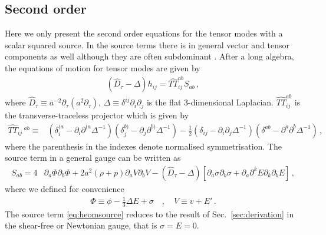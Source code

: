\documentclass[a4paper,11pt]{article}
\numberwithin{equation}{section}
\begin{document}
\subsection{Second order}
Here we only present the second order equations for the tensor modes with a scalar squared source. In the source terms there is in general vector and tensor components as well although they are often subdominant \cite{Gong:2019mui}. After a long algebra, the equations of motion for tensor modes are given by \cite{Domenech:2017ems}
\begin{align}\label{eq:heom}
(\hat D_\tau-\Delta) h_{ij}=\widehat{TT}^{ab}_{ij}S_{ab}\,,
\end{align}
where $\hat D_\tau\equiv a^{-2}\partial_\tau(a^2\partial_\tau)$, $\Delta\equiv\delta^{ij}\partial_i\partial_j$ is the flat 3-dimensional Laplacian. $\widehat{TT}^{ab}_{ij}$ is the transverse-traceless projector which is given by
\begin{align}\label{eq:tt}
   \widehat{TT}_{ij}\,^{ab}\equiv&
   \left(\delta_{i}^{(a}-\partial_i\partial^{(a}\Delta^{-1}\right)\left(\delta_j^{b)}-\partial_j\partial^{b)}\Delta^{-1}\right)-\frac{1}{2}\left(\delta_{ij}-\partial_i\partial_j\Delta^{-1}\right)\left(\delta^{ab}-\partial^a\partial^b\Delta^{-1}\right)\,,
\end{align}
where the parenthesis in the indexes denote normalised symmetrisation. The source term in a general gauge can be written as
\begin{align}\label{eq:heomsource}
S_{ab}=4&\partial_a\Phi\partial_b\Phi+2a^2\left(\rho+p\right)\partial_aV\partial_bV-(\hat D_\tau-\Delta)\left[\partial_a\sigma\partial_b\sigma+\partial_a\partial^kE\partial_k\partial_bE\right]\,,
\end{align}
where we defined for convenience
\begin{align}
\Phi\equiv\phi-\frac{1}{3}\Delta E+\sigma\quad,\quad
V\equiv v+E'\,.
\end{align}
The source term \eqref{eq:heomsource} reduces to the result of Sec.~\ref{sec:derivation} in the shear-free or Newtonian gauge, that is $\sigma=E=0$.
\end{document}
